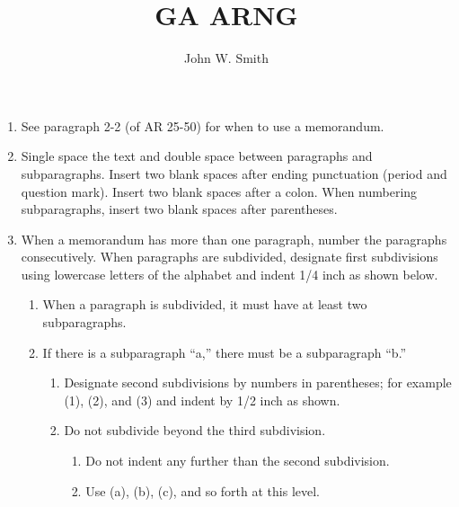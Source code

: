 \documentclass{armymemo}
\author{John W. Smith}\rank{CPT}\branch{CY}\title{GA ARNG}
\begin{document}
\begin{enumerate}
\item See paragraph 2-2 (of AR 25-50) for when to use a memorandum.
\item Single space the text and double space between paragraphs and subparagraphs. Insert two blank spaces after ending punctuation (period and question mark). Insert two blank spaces after a colon. When numbering subparagraphs, insert two blank spaces after parentheses.
\item When a memorandum has more than one paragraph, number the paragraphs consecutively. When paragraphs are subdivided, designate first subdivisions using lowercase letters of the alphabet and indent 1/4 inch as shown below.
  \begin{enumerate}
  \item When a paragraph is subdivided, it must have at least two subparagraphs.
  \item If there is a subparagraph ``a,'' there must be a subparagraph ``b.''
    \begin{enumerate}
    \item Designate second subdivisions by numbers in parentheses; for example (1), (2), and (3) and indent by 1/2 inch as shown.
    \item Do not subdivide beyond the third subdivision.
      \begin{enumerate}
      \item Do not indent any further than the second subdivision.
      \item Use (a), (b), (c), and so forth at this level.
      \end{enumerate}
    \end{enumerate}
  \end{enumerate}
\end{enumerate}
\SignatureEnclAndDistro
\end{document}

